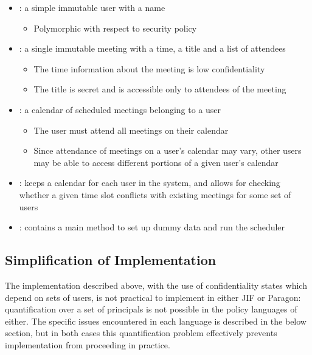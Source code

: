 \begin{itemize}
	
	\item {}: a simple immutable user with a name
	
	\begin{itemize}
		\item Polymorphic with respect to security policy
	\end{itemize}

	\item {}: a single immutable meeting with a time, a title and a list of attendees
	
	\begin{itemize}
		\item The time information about the meeting is low confidentiality
		
		\item The title is secret and is accessible only to attendees of the meeting
	\end{itemize}

	\item {}: a calendar of scheduled meetings belonging to a user

	\begin{itemize}
		\item The user must attend all meetings on their calendar
		
		\item Since attendance of meetings on a user's calendar may vary, other users may be able to access different portions of a given user's calendar
	\end{itemize}
	
	\item {}: keeps a calendar for each user in the system, and allows for checking whether a given time slot conflicts with existing meetings for some set of users
	
	\item {}: contains a main method to set up dummy data and run the scheduler
	
	
\end{itemize}

\subsection{Simplification of Implementation}

The implementation described above, with the use of confidentiality states which depend on sets of users, is not practical to implement in either JIF or Paragon: quantification over a set of principals is not possible in the policy languages of either. The specific issues encountered in each language is described in the below section, but in both cases this quantification problem effectively prevents implementation from proceeding in practice.

